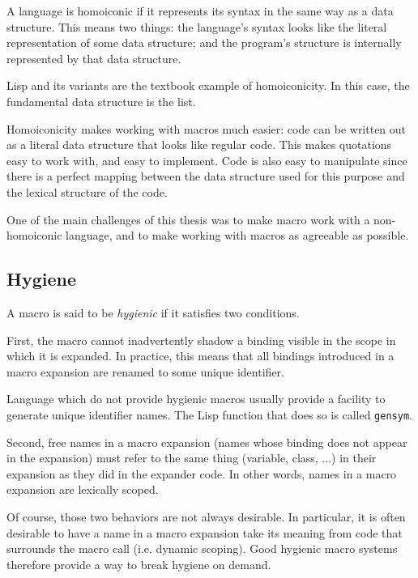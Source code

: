 A language is homoiconic if it represents its syntax in the same way as a data
structure. This means two things: the language's syntax looks like the literal
representation of some data structure; and the program's structure is internally
represented by that data structure.

Lisp and its variants are the textbook example of homoiconicity. In this case,
the fundamental data structure is the list.

Homoiconicity makes working with macros much easier: code can be written out as
a literal data structure that looks like regular code. This makes quotations
easy to work with, and easy to implement. Code is also easy to manipulate since
there is a perfect mapping between the data structure used for this purpose and
the lexical structure of the code.

One of the main challenges of this thesis was to make macro work with a
non-homoiconic language, and to make working with macros as agreeable as
possible.

\subsection{Hygiene}
\label{hygiene}

A macro is said to be \emph{hygienic} if it satisfies two conditions.

First, the macro cannot inadvertently shadow a binding visible in the scope in
which it is expanded. In practice, this means that all bindings introduced in a
macro expansion are renamed to some unique identifier.

Language which do not provide hygienic macros usually provide a facility to
generate unique identifier names. The Lisp function that does so is called
\texttt{gensym}.

Second, free names in a macro expansion (names whose binding does not appear in
the expansion) must refer to the same thing (variable, class, ...) in their
expansion as they did in the expander code. In other words, names in a macro
expansion are lexically scoped.

Of course, those two behaviors are not always desirable. In particular, it is
often desirable to have a name in a macro expansion take its meaning from code
that surrounds the macro call (i.e. dynamic scoping). Good hygienic macro
systems therefore provide a way to break hygiene on demand.

